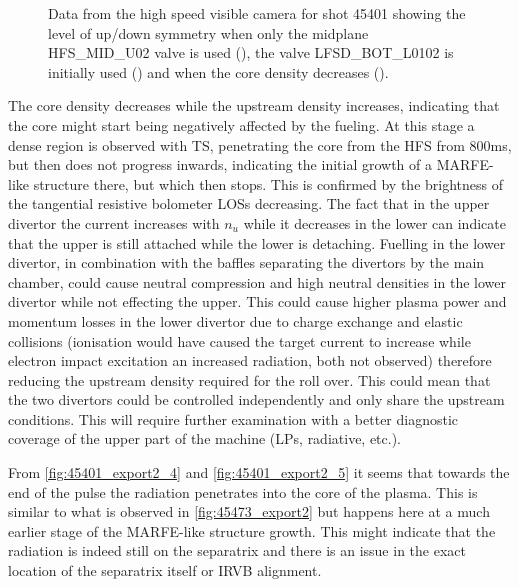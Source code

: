 \begin{figure}[!ht]
\begin{subfigure}{0.054\linewidth}
    \end{subfigure}
    \caption{Data from the high speed visible camera for shot 45401 showing the level of up/down symmetry when only the midplane HFS\_MID\_U02 valve is used (), the valve LFSD\_BOT\_L0102 is initially used () and when the core density decreases ().}
    \label{fig:mu01_tomo3}
\end{figure}

The core density decreases while the upstream density increases, indicating that the core might start being negatively affected by the fueling. At this stage a dense region is observed with TS, penetrating the core from the HFS from 800ms, but then does not progress inwards, indicating the initial growth of a MARFE-like structure there, but which then stops. This is confirmed by the brightness of the tangential resistive bolometer LOSs decreasing. The fact that in the upper divertor the current increases with $n_u$ while it decreases in the lower can indicate that the upper is still attached while the lower is detaching. Fuelling in the lower divertor, in combination with the baffles separating the divertors by the main chamber, could cause neutral compression and high neutral densities in the lower divertor while not effecting the upper. This could cause higher plasma power and momentum losses in the lower divertor due to charge exchange and elastic collisions (ionisation would have caused the target current to increase while electron impact excitation an increased radiation, both not observed) therefore reducing the upstream density required for the roll over. This could mean that the two divertors could be controlled independently and only share the upstream conditions. This will require further examination with a better diagnostic coverage of the upper part of the machine (LPs, radiative, etc.).

From \autoref{fig:45401_export2_4} and \ref{fig:45401_export2_5} it seems that towards the end of the pulse the radiation penetrates into the core of the plasma. This is similar to what is observed in \autoref{fig:45473_export2} but happens here at a much earlier stage of the MARFE-like structure growth. This might indicate that the radiation is indeed still on the separatrix and there is an issue in the exact location of the separatrix itself or IRVB alignment.

